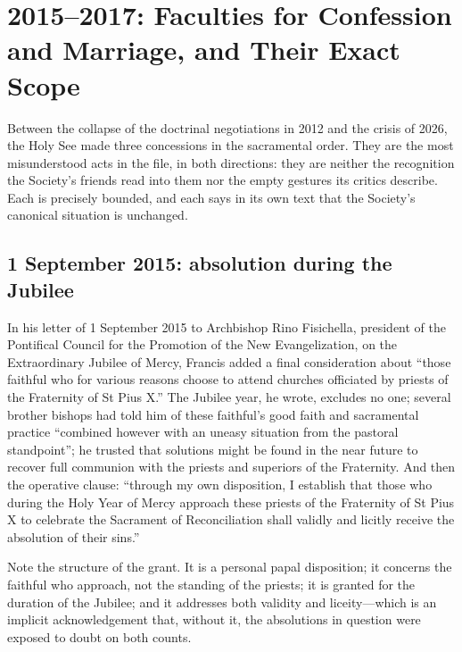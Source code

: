 \section{2015--2017: Faculties for Confession and Marriage, and Their
Exact Scope}

Between the collapse of the doctrinal negotiations in 2012 and the
crisis of 2026, the Holy See made three concessions in the sacramental
order. They are the most misunderstood acts in the file, in both
directions: they are neither the recognition the Society's friends read
into them nor the empty gestures its critics describe. Each is precisely
bounded, and each says in its own text that the Society's canonical
situation is unchanged.

\subsection{1 September 2015: absolution during the Jubilee}

In his letter of 1 September 2015 to Archbishop Rino Fisichella,
president of the Pontifical Council for the Promotion of the New
Evangelization, on the Extraordinary Jubilee of Mercy, Francis added a
final consideration about ``those faithful who for various reasons choose
to attend churches officiated by priests of the Fraternity of St Pius
X.'' The Jubilee year, he wrote, excludes no one; several brother bishops
had told him of these faithful's good faith and sacramental practice
``combined however with an uneasy situation from the pastoral
standpoint''; he trusted that solutions might be found in the near future
to recover full communion with the priests and superiors of the
Fraternity. And then the operative clause: ``through my own disposition, I
establish that those who during the Holy Year of Mercy approach these
priests of the Fraternity of St Pius X to celebrate the Sacrament of
Reconciliation shall validly and licitly receive the absolution of their
sins.''

Note the structure of the grant. It is a personal papal disposition; it
concerns the faithful who approach, not the standing of the priests; it
is granted for the duration of the Jubilee; and it addresses both
validity and liceity---which is an implicit acknowledgement that, without
it, the absolutions in question were exposed to doubt on both counts.


